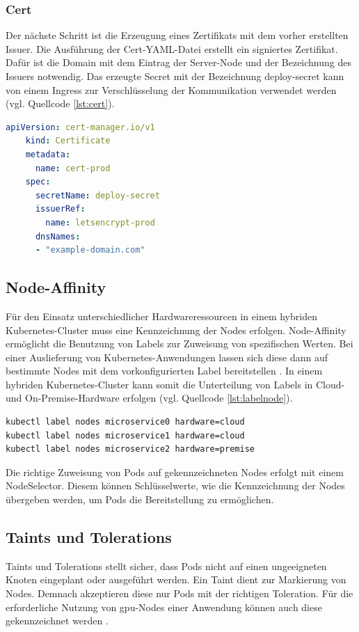 \subsubsection{Cert}
Der nächste Schritt ist die Erzeugung eines Zertifikats mit dem vorher erstellten Issuer.
Die Ausführung der Cert-YAML-Datei erstellt ein signiertes Zertifikat.
Dafür ist die Domain mit dem Eintrag der Server-Node und der Bezeichnung des Issuers notwendig.
Das erzeugte Secret mit der Bezeichnung deploy-secret kann von einem Ingress zur Verschlüsselung der Kommunikation verwendet werden (vgl. Quellcode \ref{lst:cert}). 

\begin{lstlisting}[caption={cert.yaml \cite{certmanageracme} },captionpos=b,label={lst:cert},language=yaml]
    apiVersion: cert-manager.io/v1
    kind: Certificate
    metadata:
      name: cert-prod
    spec:
      secretName: deploy-secret
      issuerRef: 
        name: letsencrypt-prod
      dnsNames:
      - "example-domain.com"

\end{lstlisting}


\subsection{Node-Affinity} \label{Nodeaffinity}
Für den Einsatz unterschiedlicher Hardwareressourcen in einem hybriden Kubernetes-Cluster muss eine Kennzeichnung der Nodes erfolgen.
Node-Affinity ermöglicht die Benutzung von Labels zur Zuweisung von spezifischen Werten.
Bei einer Auslieferung von Kubernetes-Anwendungen lassen sich diese dann auf bestimmte Nodes mit dem vorkonfigurierten Label bereitstellen \cite{nodeaffinity}.
In einem hybriden Kubernetes-Cluster kann somit die Unterteilung von Labels in Cloud- und On-Premise-Hardware erfolgen (vgl. Quellcode \ref{lst:labelnode}).


\begin{lstlisting}[caption={Node-Labels},captionpos=b,label={lst:labelnode},language=bash]
kubectl label nodes microservice0 hardware=cloud
kubectl label nodes microservice1 hardware=cloud
kubectl label nodes microservice2 hardware=premise
\end{lstlisting}

Die richtige Zuweisung von Pods auf gekennzeichneten Nodes erfolgt mit einem NodeSelector.
Diesem können Schlüsselwerte, wie die Kennzeichnung der Nodes übergeben werden, um Pods die Bereitstellung zu ermöglichen.

\subsection{Taints und Tolerations}
Taints und Tolerations stellt sicher, dass Pods nicht auf einen ungeeigneten Knoten eingeplant oder ausgeführt werden.
Ein Taint dient zur Markierung von Nodes.
Demnach akzeptieren diese nur Pods mit der richtigen Toleration.
Für die erforderliche Nutzung von \acs{gpu}-Nodes einer Anwendung können auch diese gekennzeichnet werden \cite{taintstolerations}.

